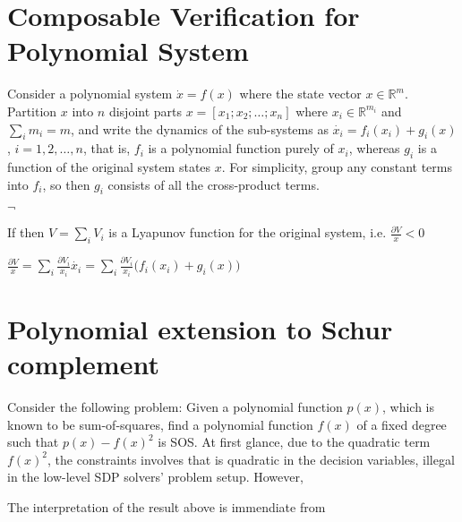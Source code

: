 \documentclass{article}
\begin{document}
\section{Composable Verification for Polynomial System} %
\label{sec:composable_verification_for_polynomial_system}
Consider a polynomial system $\dot x=f(x)$ where the state vector $x\in \mathbb{R}^m$. Partition $x$ into $n$ disjoint parts $x=[x_1;x_2;\dots;x_n]$ where $x_i \in \mathbb{R}^{m_i}$ and $\sum\limits_{i}{m_i}=m$, and write the dynamics of the sub-systems as $\dot{x_i}=f_i(x_i)+g_i(x)$, $i=1,2,\dots,n$, that is, $f_i$ is a polynomial function purely of $x_i$, whereas $g_i$ is a function of the original system states $x$. For simplicity, group any constant terms into $f_i$, so then $g_i$ consists of all the cross-product terms.

$\lnot$


If 
then $V=\sum\limits_{i}{V_i}$ is a Lyapunov function for the original system, i.e. $\frac{\partial{V}}{x}<0$

$\frac{\partial{V}}{x}=\sum\limits_{i}{\frac{\partial{V_i}}{x_i}\dot{x_i}}=\sum\limits_{i}{\frac{\partial{V_i}}{x_i}(f_i(x_i)+g_i(x)})$


\section{Polynomial extension to Schur complement} %
\label{sec:polynomial_extension_to_schur_complement}
Consider the following problem: Given a polynomial function $p(x)$, which is known to be sum-of-squares, find a polynomial function $f(x)$ of a fixed degree such that $p(x)-f(x)^2$ is SOS. At first glance, due to the quadratic term $f(x)^2$, the constraints involves that is quadratic in the decision variables, illegal in the low-level SDP solvers' problem setup. However, 


The interpretation of the result above is immendiate from 



\end{document}
